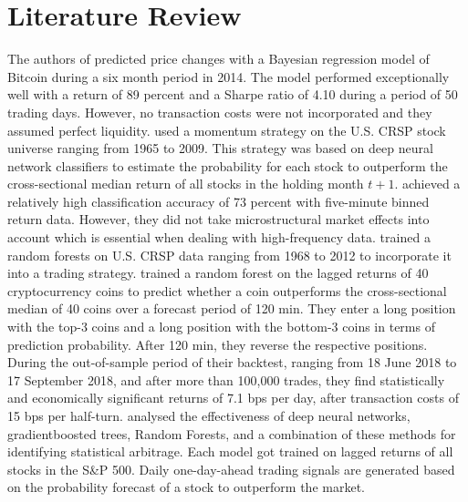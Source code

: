 \section{Literature Review}
The authors of \cite{shah2014bayesianRegression} predicted price changes with a Bayesian regression model of Bitcoin during a six month period in 2014. 
The model performed exceptionally well with a return of 89 percent and a Sharpe ratio of
4.10 during a period of 50 trading days.
However, no transaction costs were not incorporated and
they assumed perfect liquidity. 
\cite{takeuchi2013momentumTrading} used a momentum strategy on the U.S. CRSP
stock universe ranging from 1965 to 2009. This strategy was based on deep neural network
classifiers to estimate the probability for each stock to outperform the cross-sectional median
return of all stocks in the holding month $t + 1$.
\cite{dixon2015annMarketPrediction} achieved a relatively high classification accuracy of 73
percent with five-minute binned return data. 
However, they did not take microstructural market effects into account which is essential when dealing with
high-frequency data.
\cite{moritz2014partFutureReturns} trained a random forests on U.S. CRSP data ranging from 1968 to
2012 to incorporate it into a trading strategy. 
\cite{krauss2019statisticalArbitrage} trained a random
forest on the lagged returns of 40 cryptocurrency coins to predict whether a coin
outperforms the cross-sectional median of 40 coins over a forecast period of 120 min. 
They enter a long position with the top-3 coins
and a long position with the bottom-3 coins in terms of prediction probability. After 120 min, they reverse the
respective positions. During the out-of-sample period of their backtest, ranging from 18 June 2018
to 17 September 2018, and after more than 100,000 trades, they find statistically and economically
significant returns of 7.1 bps per day, after transaction costs of 15 bps per half-turn.
\cite{krauss2016arbitrageSandP} analysed the effectiveness of deep neural networks, 
gradientboosted trees, Random Forests, and a combination of these methods for identifying
statistical arbitrage. Each model got trained on lagged returns of all stocks in
the S\&P 500. Daily one-day-ahead
trading signals are generated based on the probability forecast of a stock to outperform
the market.